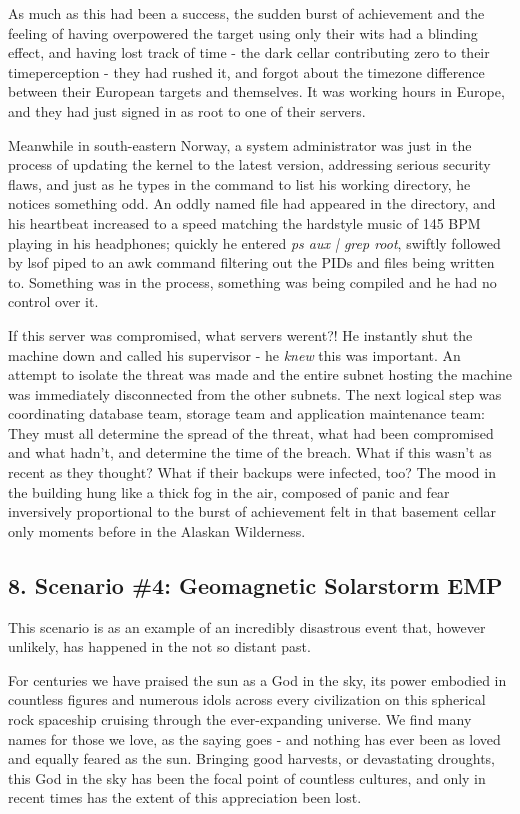 As much as this had been a success, the sudden burst of achievement and the feeling of having overpowered the target using only their wits had a blinding effect, and having lost track of time - the dark cellar contributing zero to their timeperception - they had rushed it, and forgot about the timezone difference between their European targets and themselves. It was working hours in Europe, and they had just signed in as root to one of their servers.

Meanwhile in south-eastern Norway, a system administrator was just in the process of updating the kernel to the latest version, addressing serious security flaws, and just as he types in the command to list his working directory, he notices something odd. An oddly named file had appeared in the directory, and his heartbeat increased to a speed matching the hardstyle music of 145 BPM playing in his headphones; quickly he entered \textit{ps aux | grep root}, swiftly followed by lsof piped to an awk command filtering out the PIDs and files being written to. Something was in the process, something was being compiled and he had no control over it. 

If this server was compromised, what servers werent?! He instantly shut the machine down and called his supervisor - he \textit{knew} this was important. An attempt to isolate the threat was made and the entire subnet hosting the machine was immediately disconnected from the other subnets. The next logical step was coordinating database team, storage team and application maintenance team: They must all determine the spread of the threat, what had been compromised and what hadn't, and determine the time of the breach. What if this wasn't as recent as they thought? What if their backups were infected, too? The mood in the building hung like a thick fog in the air, composed of panic and fear inversively proportional to the burst of achievement felt in that basement cellar only moments before in the Alaskan Wilderness. 


\subsection{8. Scenario \#4: Geomagnetic Solarstorm EMP}
This scenario is as an example of an incredibly disastrous event that, however unlikely, has happened in the not so distant past. 

For centuries we have praised the sun as a God in the sky, its power embodied in countless figures and numerous idols across every civilization on this spherical rock spaceship cruising through the ever-expanding universe. We find many names for those we love, as the saying goes - and nothing has ever been as loved and equally feared as the sun. Bringing good harvests, or devastating droughts, this God in the sky has been the focal point of countless cultures, and only in recent times has the extent of this appreciation been lost. 

